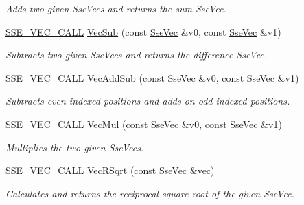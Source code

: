 \begin{DoxyCompactItemize}
\begin{DoxyCompactList}\small\item\em Adds two given Sse\+Vecs and returns the sum Sse\+Vec. \end{DoxyCompactList}\item 
\hyperlink{ssevec__math__defs_8h_a97454f977a5281455cecacce1e8ba670}{S\+S\+E\+\_\+\+V\+E\+C\+\_\+\+C\+A\+L\+L} \hyperlink{group___s_i_m_d_vec_math_gae5b54b00d65ab7f3750f1b61a0607d65}{Vec\+Sub} (const \hyperlink{namespacegfxmath_a0de2243e2b8d0fd46d3af5e036423004}{Sse\+Vec} \&v0, const \hyperlink{namespacegfxmath_a0de2243e2b8d0fd46d3af5e036423004}{Sse\+Vec} \&v1)
\begin{DoxyCompactList}\small\item\em Subtracts two given Sse\+Vecs and returns the difference Sse\+Vec. \end{DoxyCompactList}\item 
\hyperlink{ssevec__math__defs_8h_a97454f977a5281455cecacce1e8ba670}{S\+S\+E\+\_\+\+V\+E\+C\+\_\+\+C\+A\+L\+L} \hyperlink{group___s_i_m_d_vec_math_gadb08bbdc4969ec93fcc4944b6ce24f41}{Vec\+Add\+Sub} (const \hyperlink{namespacegfxmath_a0de2243e2b8d0fd46d3af5e036423004}{Sse\+Vec} \&v0, const \hyperlink{namespacegfxmath_a0de2243e2b8d0fd46d3af5e036423004}{Sse\+Vec} \&v1)
\begin{DoxyCompactList}\small\item\em Subtracts even-\/indexed positions and adds on odd-\/indexed positions. \end{DoxyCompactList}\item 
\hyperlink{ssevec__math__defs_8h_a97454f977a5281455cecacce1e8ba670}{S\+S\+E\+\_\+\+V\+E\+C\+\_\+\+C\+A\+L\+L} \hyperlink{group___s_i_m_d_vec_math_gaa0e879cb47e52747b293046920b62c31}{Vec\+Mul} (const \hyperlink{namespacegfxmath_a0de2243e2b8d0fd46d3af5e036423004}{Sse\+Vec} \&v0, const \hyperlink{namespacegfxmath_a0de2243e2b8d0fd46d3af5e036423004}{Sse\+Vec} \&v1)
\begin{DoxyCompactList}\small\item\em Multiplies the two given Sse\+Vecs. \end{DoxyCompactList}\item 
\hyperlink{ssevec__math__defs_8h_a97454f977a5281455cecacce1e8ba670}{S\+S\+E\+\_\+\+V\+E\+C\+\_\+\+C\+A\+L\+L} \hyperlink{group___s_i_m_d_vec_math_ga970ae3ba26cdacbd0648dceb4762a690}{Vec\+R\+Sqrt} (const \hyperlink{namespacegfxmath_a0de2243e2b8d0fd46d3af5e036423004}{Sse\+Vec} \&vec)
\begin{DoxyCompactList}\small\item\em Calculates and returns the reciprocal square root of the given Sse\+Vec. \end{DoxyCompactList}\item 

\end{DoxyCompactItemize}
